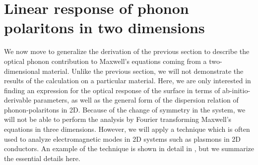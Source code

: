 \documentclass[superscriptaddress,reprint,prb]{revtex4-1}
\begin{document}

\section{Linear response of phonon polaritons in two dimensions}
We now move to generalize the derivation of the previous section to describe the optical phonon contribution to Maxwell's equations coming from a two-dimensional material. Unlike the previous section, we will not demonstrate the results of the calculation on a particular material. Here, we are only interested in finding an expression for the optical response of the surface in terms of ab-initio-derivable parameters, as well as the general form of the dispersion relation of phonon-polaritons in 2D.  Because of the change of symmetry in the system, we will not be able to perform the analysis by Fourier transforming Maxwell's equations in three dimensions. However, we will apply a technique which is often used to analyze electromagnetic modes in 2D systems such as plasmons in 2D conductors. An example of the technique is shown in detail in \cite{jablan2009plasmonics}, but we summarize the essential details here. 
\end{document}
